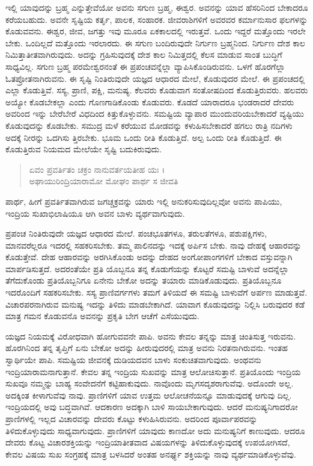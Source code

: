ಇಲ್ಲಿ ಯಾವುದನ್ನು ಬ್ರಹ್ಮ ಎನ್ನುತ್ತೇವೆಯೋ ಅವನು ಸಗುಣ ಬ್ರಹ್ಮ, ಈಶ್ವರ. ಅವನನ್ನು ಯಾವ ಹೆಸರಿನಿಂದ ಬೇಕಾದರೂ ಕರೆಯಬಹುದು. ಅವನೇ ಸೃಷ್ಟಿಯ ಕರ್ತೃ, ಪಾಲಕ, ಸಂಹಾರಕ. ಜೀವರಾಶಿಗಳಿಗೆ ಅವರವರ ಕರ್ಮಾನುಸಾರ ಫಲಗಳನ್ನು ಕೊಡುವವನು. ಈಶ್ವರ, ಜೀವ, ಜಗತ್ತು ಇವು ಮೂರೂ ಏಕಕಾಲದಲ್ಲಿ ಇರುತ್ತವೆ. ಒಂದು ಇದ್ದರೆ ಮತ್ತೊಂದು ಇರಲೇ ಬೇಕು. ಒಂದಿಲ್ಲದೆ ಮತ್ತೊಂದು ಇರಲಾರದು. ಈ ಸಗುಣ ಬಂದಿರುವುದೇ ನಿರ್ಗುಣ ಬ್ರಹ್ಮನಿಂದ. ನಿರ್ಗುಣ ದೇಶ ಕಾಲ ನಿಮಿತ್ತಾತೀತವಾಗಿರುವುದು. ಅದನ್ನು ಗ್ರಹಿಸುವುದಕ್ಕೆ ದೇಶ ಕಾಲ ನಿಮಿತ್ತದಲ್ಲಿ ಕೆಲಸ ಮಾಡುವ ಸಾಂತ ಬುದ್ಧಿಗೆ ಸಾಧ್ಯವಿಲ್ಲ. ಸಗುಣ ಬ್ರಹ್ಮ ಪರಮೇಶ್ವರನಂತೆ ಈ ಪ್ರಪಂಚವನ್ನೆಲ್ಲಾ ವ್ಯಾಪಿಸಿಕೊಂಡಿರುವನು. ಒಳಗೆ ಹೊರಗೆಲ್ಲಾ ಓತಪ್ರೋತನಾಗಿರುವನು. ಈ ಸೃಷ್ಟಿ ನಿಂತಿರುವುದೇ ಯಜ್ಞದ ಆಧಾರದ ಮೇಲೆ, ಕೊಡುವುದರ ಮೇಲೆ. ಈ ಪ್ರಪಂಚದಲ್ಲಿ ಎಲ್ಲಾ ಕೊಡುತ್ತಿವೆ. ಸಸ್ಯ, ಪ್ರಾಣಿ, ಪಕ್ಷಿ, ಮನುಷ್ಯ. ಕೆಲವರು ಕೊಡುವಾಗ ಸಂತೋಷದಿಂದ ಕೊಡುತ್ತಿರುವರು. ಹಲವರು ಅಯ್ಯೋ ಕೊಡಬೇಕಲ್ಲಾ ಎಂದು ಗೊಣಗಾಡಿಕೊಂಡು ಕೊಡುವರು. ಕೊಡದೆ ಯಾರಾದರೂ ಭಂಡರಾದರೆ ದೇವರು ಅವರಿಂದ ಇನ್ನು ಬೇರೆಬೇರೆ ವಿಧದಿಂದ ಕಿತ್ತುಕೊಳ್ಳುವನು. ಸಮಷ್ಟಿಯ ವ್ಯಾಪಾರ ಮುಂದುವರಿಯಬೇಕಾದರೆ ವ್ಯಷ್ಟಿಯು ಕೊಡುವುದನ್ನು ಕೊಡಬೇಕು. ಸಮುದ್ರ ಮಳೆ ಕರೆಯುವ ಮೋಡವನ್ನು ಕಳುಹಿಸಬೇಕಾದರೆ ಹಗಲು ರಾತ್ರಿ ನದಿಗಳು ಅದಕ್ಕೆ ನೀರನ್ನು ಒದಗಿಸು ತ್ತಿರಬೇಕು. ಭೂಮ ಒಂದು ರೀತಿ ಕೊಡುತ್ತಿದೆ. ಅಲ್ಪ ಒಂದು ರೀತಿ ಕೊಡುತ್ತಿದೆ. ಈ ಕೊಡುತ್ತಿರುವ ನಿಯಮದ ಮೇಲೆಯೇ ಸೃಷ್ಟಿ ಬದುಕಿರುವುದು.

\begin{verse}
ಏವಂ ಪ್ರವರ್ತಿತಂ ಚಕ್ರಂ ನಾನುವರ್ತಯತೀಹ ಯಃ ।\\ಅಘಾಯುರಿಂದ್ರಿಯಾರಾಮೋ ಮೋಘಂ ಪಾರ್ಥ ಸ ಜೀವತಿ 
\end{verse}

{\small ಪಾರ್ಥ, ಹೀಗೆ ಪ್ರವರ್ತಿತವಾಗಿರುವ ಜಗಚ್ಚಕ್ರವನ್ನು ಯಾರು ಇಲ್ಲಿ ಅನುಕರಿಸುವುದಿಲ್ಲವೋ ಅವನು ಪಾಪಿಯು, ಇಂದ್ರಿಯ ಸುಖಾಭಿಲಾಷಿಯೂ ಆಗಿ ಅವನ ಬಾಳು ವ್ಯರ್ಥವಾಗುವುದು.}

ಪ್ರಪಂಚ ನಿಂತಿರುವುದೇ ಯಜ್ಞದ ಆಧಾರದ ಮೇಲೆ. ಪಂಚಭೂತಗಳೂ, ತರುಲತೆಗಳೂ, ಪಶುಪಕ್ಷಿಗಳು, ಮಾನವರೆಲ್ಲರೂ ಇದರಲ್ಲಿ ಸಹಕರಿಸಬೇಕು. ತಮ್ಮ ಪಾಲಿನದನ್ನು ಇದಕ್ಕೆ ಅರ್ಪಿಸ ಬೇಕು. ನಾವು ದೇಹಕ್ಕೆ ಆಹಾರವನ್ನು ಕೊಡುತ್ತೇವೆ. ದೇಹ ಆಹಾರವನ್ನು ಅರಗಿಸಿಕೊಂಡು ಅದನ್ನು ದೇಹದ ಅಂಗೋಪಾಂಗಗಳಿಗೆ ಬೇಕಾದ ವಸ್ತುವನ್ನಾಗಿ ಮಾರ್ಪಡಿಸುತ್ತದೆ. ಅದರಂತೆಯೇ ಪ್ರತಿ ಯೊಬ್ಬನೂ ತನ್ನ ಕೊಡುಗೆಯನ್ನು ಕೊಟ್ಟರೆ ಸಮಷ್ಟಿ ಬಾಳುವೆ ಅದನ್ನೆಲ್ಲಾ ತೆಗೆದುಕೊಂಡು ಪ್ರತಿಯೊಬ್ಬನಿಗೂ ಏನೇನು ಬೇಕೋ ಅದನ್ನು ತಯಾರು ಮಾಡಿಕೊಡುವುದು. ಪ್ರತಿಯೊಬ್ಬನೂ ಇದರೊಂದಿಗೆ ಸಹಕರಿಸಬೇಕು. ಸಸ್ಯ ಪ್ರಾಣಿವರ್ಗಗಳು ತಮಗೆ ತಿಳಿಯದೆ ಈ ಸಮಷ್ಟಿ ಬಾಳುವೆಗೆ ಅರ್ಪಣ ಮಾಡುತ್ತವೆ. ವಿಚಾರಪರನಾಗಿರುವ ಮನುಷ್ಯ ಇದನ್ನು ತಿಳಿದು ಮಾಡಬೇಕಾಗಿದೆ. ಯಾವಾಗ ಕೊಡುವುದನ್ನು ನಿಲ್ಲಿಸಿ ಬರುವುದರ ಕಡೆ ಮಾತ್ರ ಗಮನ ಕೊಡುವನೊ ಅವನನ್ನು ಪ್ರಕೃತಿ ಬೇಗ ಆಚೆಗೆ ಎಸೆಯುವುದು.

ಯಜ್ಞದ ನಿಯಮಕ್ಕೆ ವಿರೋಧವಾಗಿ ಹೋಗುವವನೇ ಪಾಪಿ. ಅವನು ಕೇವಲ ತನ್ನನ್ನು ಮಾತ್ರ ಚಿಂತಿಸುತ್ತ ಇರುವನು. ಹೊರಗಿನಿಂದ ತನ್ನ ತೃಪ್ತಿಗೆ ಏನು ಬೇಕೋ ಅದನ್ನು ಹೀರುವುದರಲ್ಲಿ ಮಾತ್ರ ಅವನು ನಿರತನಾಗಿರುವನು. ಇಂತಹ ಸ್ವಾರ್ಥಿಯೇ ಪಾಪಿ. ಸಮಷ್ಟಿಯ ಜೀವನಕ್ಕೆ ದುಡಿಯದವನ ಬಾಳು ಸಂಕುಚಿತವಾಗುವುದು. ಅಂಥವನು ಇಂದ್ರಿಯಾರಾಮನಾಗುತ್ತಾನೆ. ಕೇವಲ ತನ್ನ ಇಂದ್ರಿಯ ಸುಖವನ್ನು ಮಾತ್ರ ಆಲೋಚಿಸುತ್ತಾನೆ. ಪ್ರತಿಯೊಂದು ಇಂದ್ರಿಯ ಸುಖವೂ ನಮ್ಮನ್ನು ಬಾಹ್ಯ ಸಂವೇದನೆಗೆ ಕಟ್ಟಿಹಾಕುವುದು. ನಾವೊಂದು ಮೃಗಸದೃಶರಾಗುವೆವು. ಅದೊಂದೇ ಅಲ್ಲ. ಅದಕ್ಕಿಂತ ಕೀಳಾಗುವೆವು ನಾವು. ಪ್ರಾಣಿಗಳಿಗೆ ಯಾವ ಉತ್ತಮ ಆಲೋಚನೆಯನ್ನೂ ಮಾಡುವುದಕ್ಕೆ ಆಗುವು ದಿಲ್ಲ. ಇಂದ್ರಿಯದಲ್ಲಿ ಅವು ಬದ್ಧವಾಗಿವೆ. ಆದಕಾರಣ ಅದಕ್ಕಾಗಿ ಬಾಳಿ ಸಾಯಬೇಕಾಗುವುದು. ಆದರೆ ಮನುಷ್ಯನಿಗಾದರೋ ಪ್ರಾಣಿಗಳಲ್ಲಿ ಇಲ್ಲದ ವಿಚಾರವನ್ನು ದೇವರು ಕೊಟ್ಟು ಕಳುಹಿಸಿರುವನು. ಅದರಿಂದ ಪೂರ್ವಾಪರವನ್ನು ತಿಳಿದುಕೊಳ್ಳುವುದು ಸಾಧ್ಯವಾಗುವುದು. ಪ್ರಾಣಿಗಳಿಗೆ ಯಾವುದು ಕಾಣದೋ ಅದು ಮನುಷ್ಯನಿಗೆ ಕಾಣುವುದು. ಆದರೂ ದೇವರು ಕೊಟ್ಟ ವಿಚಾರಶಕ್ತಿಯನ್ನು ಇಂದ್ರಿಯಾತೀತವಾದ ವಿಷಯಗಳನ್ನು ತಿಳಿದುಕೊಳ್ಳುವುದಕ್ಕೆ ಉಪಯೋಗಿಸದೆ, ಕೇವಲ ವಿಷಯ ಸುಖ ಸಂಗ್ರಹಕ್ಕೆ ಮಾತ್ರ ಬಳಸಿದರೆ ಅಂತಹ ಅನರ್ಘ್ಯ ಶಕ್ತಿಯನ್ನು ನಾವು ವ್ಯರ್ಥಮಾಡಿಕೊಳ್ಳುವೆವು.

